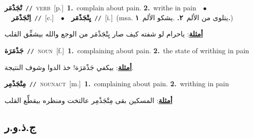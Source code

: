 \documentclass[10pt,a4paper,twoside]{article} %
\begin{document}
\begin{multicols}{2}
{\setlength\topsep{0pt}\textbf{\foreignlanguage{arabic}{تْجَذْمَر}}\ {\color{gray}\texttt{//}\color{black}}\ \textsc{verb}\ [p.]\ \textbf{1.}~complain about pain.  \textbf{2.}~writhe in pain\ \ $\bullet$\ \ \setlength\topsep{0pt}\textbf{\foreignlanguage{arabic}{اِتْجَذْمَر}}\ {\color{gray}\texttt{//}\color{black}}\ [c.]\ \ $\bullet$\ \ \setlength\topsep{0pt}\textbf{\foreignlanguage{arabic}{يِتْجَذْمَر}}\ {\color{gray}\texttt{//}\color{black}}\ [i.]\ \color{gray}(msa. \foreignlanguage{arabic}{يتلوى من الألم}~\foreignlanguage{arabic}{\textbf{٢.}}  .\foreignlanguage{arabic}{يشكو الألم}~\foreignlanguage{arabic}{\textbf{١.}})\color{black}\  \begin{flushright}\color{gray}\foreignlanguage{arabic}{\textbf{\underline{\foreignlanguage{arabic}{أمثلة}}}: ياحرام لو شفته كيف صار يِتْجَذْمَر من الوجع والله بيشفِّق القلب}\end{flushright}\color{black}} \vspace{2mm}

{\setlength\topsep{0pt}\textbf{\foreignlanguage{arabic}{جَذْمَرَة}}\ {\color{gray}\texttt{//}\color{black}}\ \textsc{noun}\ [f.]\ \textbf{1.}~complaining about pain.  \textbf{2.}~the state of writhing in pain\  \begin{flushright}\color{gray}\foreignlanguage{arabic}{\textbf{\underline{\foreignlanguage{arabic}{أمثلة}}}: بيكفي جَذْمَرَة! خذ الدوا وشوف النتيجة.}\end{flushright}\color{black}} \vspace{2mm}

{\setlength\topsep{0pt}\textbf{\foreignlanguage{arabic}{مِتْجَذْمِر}}\ {\color{gray}\texttt{//}\color{black}}\ \textsc{noun\textunderscore act}\ [m.]\ \textbf{1.}~complaining about pain.  \textbf{2.}~writhing in pain\  \begin{flushright}\color{gray}\foreignlanguage{arabic}{\textbf{\underline{\foreignlanguage{arabic}{أمثلة}}}: المسكين بقى مِتْجَذْمِر عالتخت ومنظره بيقطِّع القلب}\end{flushright}\color{black}} \vspace{2mm}

\vspace{-3mm}
\subsection*{\color{blue}\foreignlanguage{arabic}{ج.ذ.و.ر}\color{blue}{}} 


\end{multicols}
\end{document}
